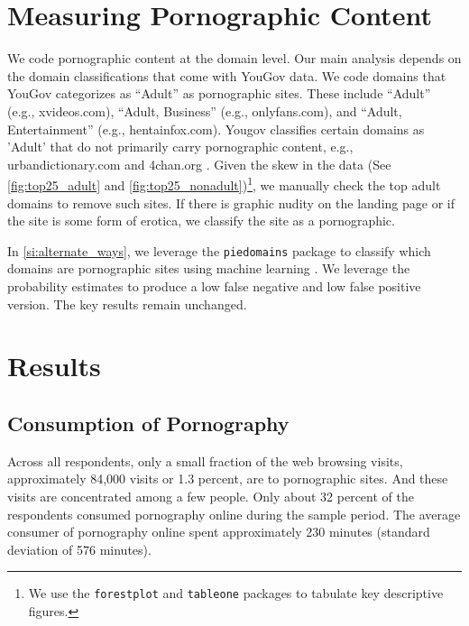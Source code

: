 \documentclass[12pt, letterpaper]{article}
\begin{document}
\section*{Measuring Pornographic Content}\label{sec:measuring_porn_content}

We code pornographic content at the domain level. Our main analysis depends on the domain classifications that come with YouGov data. We code domains that YouGov categorizes as ``Adult'' as pornographic sites. These include ``Adult'' (e.g., xvideos.com), ``Adult, Business'' (e.g., onlyfans.com), and ``Adult, Entertainment'' (e.g., hentainfox.com). Yougov classifies certain domains as 'Adult' that do not primarily carry pornographic content, e.g., urbandictionary.com and 4chan.org . Given the skew in the data (See \cref{fig:top25_adult} and \cref{fig:top25_nonadult})\footnote{We use the \texttt{forestplot} \citep{forestplot} and \texttt{tableone} \citep{tableone} packages to tabulate key descriptive figures.}, we manually check the top adult domains to remove such sites. If there is graphic nudity on the landing page or if the site is some form of erotica, we classify the site as a pornographic. 

In \ref{si:alternate_ways}, we leverage the \texttt{piedomains} package to classify which domains are pornographic sites using machine learning \citep{Chintalapati_piedomains_Predict_the_2022}. We leverage the probability estimates to produce a low false negative and low false positive version. The key results remain unchanged. 


\section*{Results}\label{sec:results}

\subsection*{Consumption of Pornography}
Across all respondents, only a small fraction of the web browsing visits, approximately 84,000 visits or 1.3 percent, are to pornographic sites. And these visits are concentrated among a few people. Only about 32 percent of the respondents consumed pornography online during the sample period. The average consumer of pornography online spent approximately 230 minutes (standard deviation of 576 minutes). 
\end{document}
